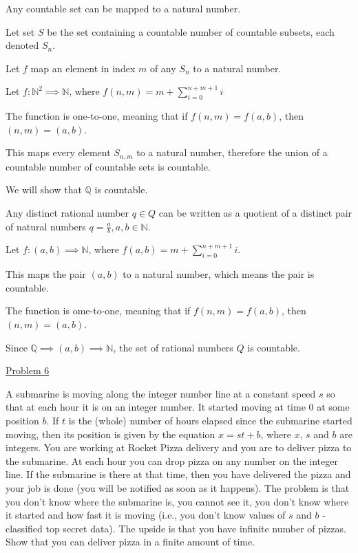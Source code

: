\documentclass{article}
\begin{document}
Any countable set can be mapped to a natural number. 

Let set $S$ be the set containing a countable number of countable subsets, each denoted $S_n$. 

Let $f$ map an element in index $m$ of any $S_n$ to a natural number.

Let $f: \mathbb{N}^2 \implies \mathbb{N}$, where $f(n,m) = m + \sum_{i=0}^{n + m + 1}i$

The function is one-to-one, meaning that if $f(n,m)=f(a,b)$, then $(n,m)=(a,b)$.

This maps every element $S_{n,m}$ to a natural number, therefore the union of a countable number of countable sets is countable.

\bigskip

We will show that $\mathbb{Q}$ is countable.

Any distinct rational number $q\in Q$ can be written as a quotient of a distinct pair of natural numbers $q=\frac{a}{b},a,b\in\mathbb{N}$.

Let $f:(a,b)\implies\mathbb{N}$, where $f(a,b) = m + \sum_{i=0}^{n + m + 1}i$.

This maps the pair $(a,b)$ to a natural number, which means the pair is countable.

The function is ome-to-one, meaning that if $f(n,m)=f(a,b)$, then $(n,m)=(a,b)$.

Since $\mathbb{Q}\implies (a,b)\implies \mathbb{N}$, the set of rational numbers $Q$ is countable.

\underline{Problem 6}

A submarine is moving along the integer number line at a constant speed $s$ so that at each hour it is on an
integer number. It started moving at time 0 at some position $b$. If $t$ is the (whole) number of hours elapsed
since the submarine started moving, then its position is given by the equation $x = st + b$, where $x$, $s$ and $b$
are integers.
\smallskip
You are working at Rocket Pizza delivery and you are to deliver pizza to the submarine. At each hour you
can drop pizza on any number on the integer line. If the submarine is there at that time, then you have
delivered the pizza and your job is done (you will be notified as soon as it happens).
\smallskip
The problem is that you don’t know where the submarine is, you cannot see it, you don’t know where it
started and how fast it is moving (i.e., you don’t know values of $s$ and $b$ - classified top secret data). The
upside is that you have infinite number of pizzas.
\smallskip
Show that you can deliver pizza in a finite amount of time.
\bigskip
\end{document}
